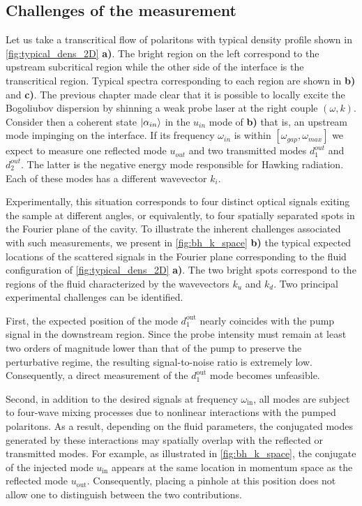 \subsection{Challenges of the measurement}


Let us take a transcritical flow of polaritons with typical density profile shown in \autoref{fig:typical_dens_2D} \textbf{a)}. The bright
region on the left correspond to the upstream subcritical region while the other side of the interface is the transcritical region. Typical spectra corresponding to each region are shown in \textbf{b)} and \textbf{c)}.
The previous chapter made clear that it is possible to locally excite the Bogoliubov dispersion by shinning a weak probe laser at the right couple $(\omega, k)$. Consider then a coherent state
$\ket{\alpha_{in}}$ in the $u_{in}$ mode of \textbf{b)} that is, an upstream mode impinging on the interface. If its frequency $\omega_{in}$ is within $[\omega_{gap}, \omega_{max}]$ we expect to measure one reflected mode $u_{out}$ and two transmitted modes $d_1^{out}$ and $d_2^{out}$. The latter is the negative
energy mode responsible for Hawking radiation. Each of these modes has a different wavevector $k_i$.

\bigskip


Experimentally, this situation corresponds to four distinct optical signals exiting the sample at different angles, or equivalently, to four spatially separated spots in the Fourier plane of the cavity. To illustrate the inherent challenges associated with such measurements, we present in \autoref{fig:bh_k_space} \textbf{b)} the typical expected locations of the scattered signals in the Fourier plane corresponding to the fluid configuration of \autoref{fig:typical_dens_2D} \textbf{a)}. The two bright spots correspond to the regions of the fluid characterized by the wavevectors \(k_u\) and \(k_d\). Two principal experimental challenges can be identified. 

First, the expected position of the mode \(d_1^{\text{out}}\) nearly coincides with the pump signal in the downstream region. Since the probe intensity must remain at least two orders of magnitude lower than that of the pump to preserve the perturbative regime, the resulting signal-to-noise ratio is extremely low. Consequently, a direct measurement of the \(d_1^{\text{out}}\) mode becomes unfeasible.

Second, in addition to the desired signals at frequency \(\omega_{\text{in}}\), all modes are subject to four-wave mixing processes due to nonlinear interactions with the pumped polaritons. As a result, depending on the fluid parameters, the conjugated modes generated by these interactions may spatially overlap with the reflected or transmitted modes. For example, as illustrated in \autoref{fig:bh_k_space}, the conjugate of the injected mode \(u_{\text{in}}\) appears at the same location in momentum space as the reflected mode \(u_{\text{out}}\). Consequently, placing a pinhole at this position does not allow one to distinguish between the two contributions.

